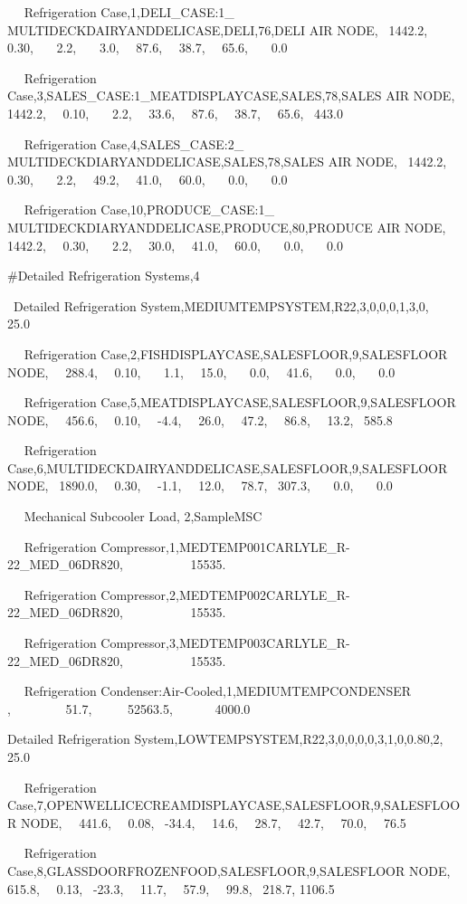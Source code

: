 ~~ Refrigeration Case,1,DELI\_CASE:1\_ MULTIDECKDAIRYANDDELICASE,DELI,76,DELI AIR NODE,~ 1442.2,~~ 0.30,~~~ 2.2,~~~ 3.0,~~ 87.6,~~ 38.7,~~ 65.6,~~~ 0.0

~~ Refrigeration Case,3,SALES\_CASE:1\_MEATDISPLAYCASE,SALES,78,SALES AIR NODE,~ 1442.2,~~ 0.10,~~~ 2.2,~~ 33.6,~~ 87.6,~~ 38.7,~~ 65.6,~ 443.0

~~ Refrigeration Case,4,SALES\_CASE:2\_ MULTIDECKDIARYANDDELICASE,SALES,78,SALES AIR NODE,~ 1442.2,~~ 0.30,~~~ 2.2,~~ 49.2,~~ 41.0,~~ 60.0,~~~ 0.0,~~~ 0.0

~~ Refrigeration Case,10,PRODUCE\_CASE:1\_ MULTIDECKDIARYANDDELICASE,PRODUCE,80,PRODUCE AIR NODE,~ 1442.2,~~ 0.30,~~~ 2.2,~~ 30.0,~~ 41.0,~~ 60.0,~~~ 0.0,~~~ 0.0

\#Detailed Refrigeration Systems,4

~Detailed Refrigeration System,MEDIUMTEMPSYSTEM,R22,3,0,0,0,1,3,0,~~~ 25.0

~~ Refrigeration Case,2,FISHDISPLAYCASE,SALESFLOOR,9,SALESFLOOR NODE,~~ 288.4,~~ 0.10,~~~ 1.1,~~ 15.0,~~~ 0.0,~~ 41.6,~~~ 0.0,~~~ 0.0

~~ Refrigeration Case,5,MEATDISPLAYCASE,SALESFLOOR,9,SALESFLOOR NODE,~~ 456.6,~~ 0.10,~~ -4.4,~~ 26.0,~~ 47.2,~~ 86.8,~~ 13.2,~ 585.8

~~ Refrigeration Case,6,MULTIDECKDAIRYANDDELICASE,SALESFLOOR,9,SALESFLOOR NODE,~ 1890.0,~~ 0.30,~~ -1.1,~~ 12.0,~~ 78.7,~ 307.3,~~~ 0.0,~~~ 0.0

~~ Mechanical Subcooler Load, 2,SampleMSC

~~ Refrigeration Compressor,1,MEDTEMP001CARLYLE\_R-22\_MED\_06DR820,~~~~~~~~~~ 15535.

~~ Refrigeration Compressor,2,MEDTEMP002CARLYLE\_R-22\_MED\_06DR820,~~~~~~~~~~ 15535.

~~ Refrigeration Compressor,3,MEDTEMP003CARLYLE\_R-22\_MED\_06DR820,~~~~~~~~~~ 15535.

~~ Refrigeration Condenser:Air-Cooled,1,MEDIUMTEMPCONDENSER~ ,~~~~~~~~ 51.7,~~~~~ 52563.5,~~~~~~ 4000.0

Detailed Refrigeration System,LOWTEMPSYSTEM,R22,3,0,0,0,0,3,1,0,0.80,2,~~~ 25.0

~~ Refrigeration Case,7,OPENWELLICECREAMDISPLAYCASE,SALESFLOOR,9,SALESFLOOR NODE,~~ 441.6,~~ 0.08,~ -34.4,~~ 14.6,~~ 28.7,~~ 42.7,~~ 70.0,~~ 76.5

~~ Refrigeration Case,8,GLASSDOORFROZENFOOD,SALESFLOOR,9,SALESFLOOR NODE,~~ 615.8,~~ 0.13,~ -23.3,~~ 11.7,~~ 57.9,~~ 99.8,~ 218.7, 1106.5

